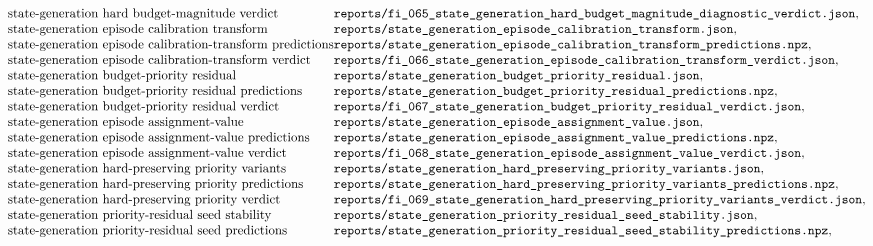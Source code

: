 $$\begin{array}{@{}l@{}l@{}}
\text{state-generation hard budget-magnitude verdict} & \texttt{reports/fi\_065\_state\_generation\_hard\_budget\_magnitude\_diagnostic\_verdict.json},\\
\text{state-generation episode calibration transform} & \texttt{reports/state\_generation\_episode\_calibration\_transform.json},\\
\text{state-generation episode calibration-transform predictions} & \texttt{reports/state\_generation\_episode\_calibration\_transform\_predictions.npz},\\
\text{state-generation episode calibration-transform verdict} & \texttt{reports/fi\_066\_state\_generation\_episode\_calibration\_transform\_verdict.json},\\
\text{state-generation budget-priority residual} & \texttt{reports/state\_generation\_budget\_priority\_residual.json},\\
\text{state-generation budget-priority residual predictions} & \texttt{reports/state\_generation\_budget\_priority\_residual\_predictions.npz},\\
\text{state-generation budget-priority residual verdict} & \texttt{reports/fi\_067\_state\_generation\_budget\_priority\_residual\_verdict.json},\\
\text{state-generation episode assignment-value} & \texttt{reports/state\_generation\_episode\_assignment\_value.json},\\
\text{state-generation episode assignment-value predictions} & \texttt{reports/state\_generation\_episode\_assignment\_value\_predictions.npz},\\
\text{state-generation episode assignment-value verdict} & \texttt{reports/fi\_068\_state\_generation\_episode\_assignment\_value\_verdict.json},\\
\text{state-generation hard-preserving priority variants} & \texttt{reports/state\_generation\_hard\_preserving\_priority\_variants.json},\\
\text{state-generation hard-preserving priority predictions} & \texttt{reports/state\_generation\_hard\_preserving\_priority\_variants\_predictions.npz},\\
\text{state-generation hard-preserving priority verdict} & \texttt{reports/fi\_069\_state\_generation\_hard\_preserving\_priority\_variants\_verdict.json},\\
\text{state-generation priority-residual seed stability} & \texttt{reports/state\_generation\_priority\_residual\_seed\_stability.json},\\
\text{state-generation priority-residual seed predictions} & \texttt{reports/state\_generation\_priority\_residual\_seed\_stability\_predictions.npz},\\

\end{array}$$
